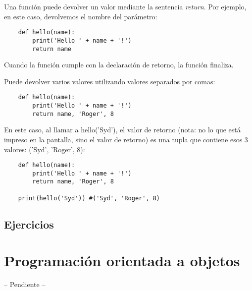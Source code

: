 \documentclass[12pt]{article}
\begin{document}
    Una función puede devolver un valor mediante la sentencia \textit{return}.
    Por ejemplo, en este caso, devolvemos el nombre del parámetro:
    \begin{lstlisting}
    def hello(name):
        print('Hello ' + name + '!')
        return name
    \end{lstlisting}
    Cuando la función cumple con la declaración de retorno, la función finaliza.

    Puede devolver varios valores utilizando valores separados por comas:
    \begin{lstlisting}
    def hello(name):
        print('Hello ' + name + '!')
        return name, 'Roger', 8
    \end{lstlisting}

    En este caso, al llamar a hello('Syd'), el valor de retorno (nota: no lo que está impreso en la pantalla,
    sino el valor de retorno) es una tupla que contiene esos 3 valores: ('Syd', 'Roger', 8):

    \begin{lstlisting}
    def hello(name):
        print('Hello ' + name + '!')
        return name, 'Roger', 8

    print(hello('Syd')) #('Syd', 'Roger', 8)
    \end{lstlisting}


    \subsection{Ejercicios}

















    \newpage
    \section{Programación orientada a objetos}
    -- Pendiente --
\end{document}
